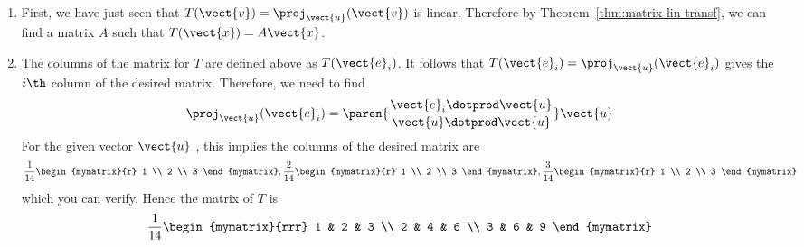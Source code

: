 \begin{solution}
\begin{enumerate}
\item
First, we have just seen that $T (\vect{v}) = \proj_{\vect{u}}(\vect{v})$ is linear. Therefore by Theorem~\ref{thm:matrix-lin-transf}, we can find a matrix $A$ such that $T(\vect{x}) = A\vect{x}$. 

\item
The columns of the matrix for $T$ are defined above as $T(\vect{e}_{i})$. 
It follows that $T(\vect{e}_{i}) = \proj
_{\vect{u}}(\vect{e}_{i}) $ gives the $i\th$ column of the
desired matrix. Therefore, we need to find
\begin{equation*}
\proj_{\vect{u}}(\vect{e}_{i}) = \paren{\vspace{0.05in}
\frac{\vect{e}_{i}\dotprod \vect{u}}{\vect{u}\dotprod \vect{u}}}
\vect{u}
\end{equation*}
For the given vector $\vect{u}$ , this implies the columns of the desired
matrix are
\begin{equation*}
\vspace{0.05in}\frac{1}{14}\begin{mymatrix}{r}
1 \\
2 \\
3
\end{mymatrix} ,\vspace{0.05in}\frac{2}{14}\begin{mymatrix}{r}
1 \\
2 \\
3
\end{mymatrix} ,\vspace{0.05in}\frac{3}{14}\begin{mymatrix}{r}
1 \\
2 \\
3
\end{mymatrix} 
\end{equation*}
which you can verify.
Hence the matrix of $T$ is
\begin{equation*}
\vspace{0.05in}\frac{1}{14}\begin{mymatrix}{rrr}
1 & 2 & 3 \\
2 & 4 & 6 \\
3 & 6 & 9
\end{mymatrix} 
\end{equation*}
\end{enumerate}
\end{solution}
